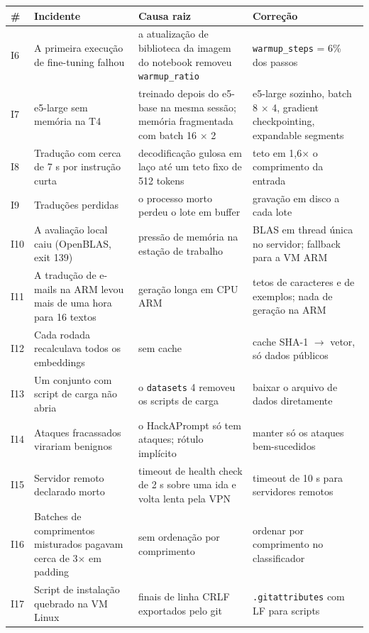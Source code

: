 \documentclass[11pt]{article}
\newcommand{\code}[1]{\texttt{#1}}
\begin{document}
\begin{center}
\small
\begin{tabularx}{\linewidth}{@{}l>{\raggedright\arraybackslash\hsize=0.88\hsize}X>{\raggedright\arraybackslash\hsize=1.10\hsize}X>{\raggedright\arraybackslash\hsize=1.02\hsize}X@{}}
\toprule
\# & Incidente & Causa raiz & Correção \\
\midrule
I6 & A primeira execução de fine-tuning falhou & a atualização de biblioteca da imagem do notebook removeu \code{warmup\_ratio} & \code{warmup\_steps} = 6\% dos passos %
 \\
I7 & e5-large sem memória na T4 & treinado depois do e5-base na mesma sessão; memória fragmentada com batch 16 \ensuremath{\times} 2 & e5-large sozinho, batch 8 \ensuremath{\times} 4, gradient checkpointing, expandable segments %
 \\
I8 & Tradução com cerca de 7 s por instrução curta & decodificação gulosa em laço até um teto fixo de 512 tokens & teto em 1,6\ensuremath{\times} o comprimento da entrada %
 \\
I9 & Traduções perdidas & o processo morto perdeu o lote em buffer & gravação em disco a cada lote %
 \\
I10 & A avaliação local caiu (OpenBLAS, exit 139) & pressão de memória na estação de trabalho & BLAS em thread única no servidor; fallback para a VM ARM %
 \\
I11 & A tradução de e-mails na ARM levou mais de uma hora para 16 textos & geração longa em CPU ARM & tetos de caracteres e de exemplos; nada de geração na ARM %
 \\
I12 & Cada rodada recalculava todos os embeddings & sem cache & cache SHA-1 \ensuremath{\rightarrow} vetor, só dados públicos %
 \\
I13 & Um conjunto com script de carga não abria & o \code{datasets} 4 removeu os scripts de carga & baixar o arquivo de dados diretamente %
 \\
I14 & Ataques fracassados virariam benignos & o HackAPrompt só tem ataques; rótulo implícito & manter só os ataques bem-sucedidos %
 \\
I15 & Servidor remoto declarado morto & timeout de health check de 2 s sobre uma ida e volta lenta pela VPN & timeout de 10 s para servidores remotos %
 \\
I16 & Batches de comprimentos misturados pagavam cerca de 3\ensuremath{\times} em padding & sem ordenação por comprimento & ordenar por comprimento no classificador %
 \\
I17 & Script de instalação quebrado na VM Linux & finais de linha CRLF exportados pelo git & \code{.\allowbreak{}gitattributes} com LF para scripts %
 \\
\bottomrule
\end{tabularx}
\end{center}
\end{document}
